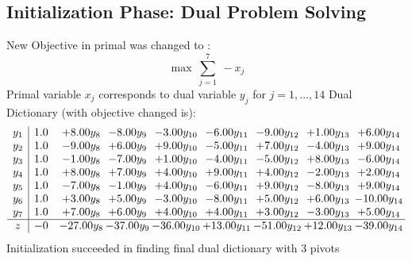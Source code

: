 \documentclass[8pt]{article}
\begin{document}
\subsection{Initialization Phase: Dual Problem Solving}
New Objective in primal was changed to : \[ \max\ \sum_{j=1}^{7}\ - x_j \] 
Primal variable $x_j$ corresponds to dual variable $y_j$ for $j = 1,\ldots,14$
Dual Dictionary (with objective changed is): 
\[\begin{array}{c| c c@{\hskip 2pt} c@{\hskip 2pt} c@{\hskip 2pt} c@{\hskip 2pt} c@{\hskip 2pt} c@{\hskip 2pt} c@{\hskip 2pt} }
 y_{1}   &  1.0 & +  8.00 y_{8} & -8.00 y_{9} & -3.00 y_{10} & -6.00 y_{11} & -9.00 y_{12} & +  1.00 y_{13} & +  6.00 y_{14}\\
 y_{2}   &  1.0 & -9.00 y_{8} & +  6.00 y_{9} & +  9.00 y_{10} & -5.00 y_{11} & +  7.00 y_{12} & -4.00 y_{13} & +  9.00 y_{14}\\
 y_{3}   &  1.0 & -1.00 y_{8} & -7.00 y_{9} & +  1.00 y_{10} & -4.00 y_{11} & -5.00 y_{12} & +  8.00 y_{13} & -6.00 y_{14}\\
 y_{4}   &  1.0 & +  8.00 y_{8} & +  7.00 y_{9} & +  4.00 y_{10} & +  9.00 y_{11} & +  4.00 y_{12} & -2.00 y_{13} & +  2.00 y_{14}\\
 y_{5}   &  1.0 & -7.00 y_{8} & -1.00 y_{9} & +  4.00 y_{10} & -6.00 y_{11} & +  9.00 y_{12} & -8.00 y_{13} & +  9.00 y_{14}\\
 y_{6}   &  1.0 & +  3.00 y_{8} & +  5.00 y_{9} & -3.00 y_{10} & -8.00 y_{11} & +  5.00 y_{12} & +  6.00 y_{13} & -10.00 y_{14}\\
 y_{7}   &  1.0 & +  7.00 y_{8} & +  6.00 y_{9} & +  4.00 y_{10} & +  4.00 y_{11} & +  3.00 y_{12} & -3.00 y_{13} & +  5.00 y_{14}\\
\hline
z    &  -0 & -27.00 y_{8} & -37.00 y_{9} & -36.00 y_{10} & + 13.00 y_{11} & -51.00 y_{12} & + 12.00 y_{13} & -39.00 y_{14}\\
\end{array}\]
Initialization succeeded in finding final dual dictionary with 3 pivots
\end{document}
